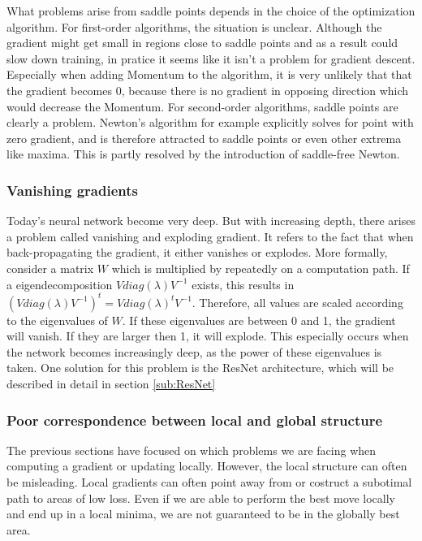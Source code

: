 What problems arise from saddle points depends in the choice of the optimization
algorithm. For first-order algorithms, the situation is unclear. Although the
gradient might get small in regions close to saddle points and as a result could
slow down training, in pratice it seems like it isn't a problem for gradient
descent. Especially when adding Momentum to the algorithm, it is very unlikely
that that the gradient becomes 0, because there is no gradient in opposing
direction which would decrease the Momentum. For second-order algorithms, saddle
points are clearly a problem. Newton's algorithm for example explicitly solves
for point with zero gradient, and is therefore attracted to saddle points or
even other extrema like maxima. This is partly resolved by the introduction of
saddle-free Newton. 


\subsubsection{Vanishing gradients}\label{sub:Vanishing_gradient} Today's neural
network become very deep. But with increasing depth, there arises a problem
called vanishing and exploding gradient. It refers to the fact that when
back-propagating the gradient, it either vanishes or explodes. More formally,
consider a matrix $W$ which is multiplied by repeatedly on a computation path.
If a eigendecomposition $Vdiag(\lambda )V^{-1}$ exists, this results in
$(Vdiag(\lambda )V^{-1})^t=Vdiag(\lambda )^tV^{-1}$. Therefore, all values are
scaled according to the eigenvalues of $W$. If these eigenvalues are between 0
and 1, the gradient will vanish. If they are larger then 1, it will explode.
This especially occurs when the network becomes increasingly deep, as the power
of these eigenvalues is taken. One solution for this problem is the ResNet
architecture, which will be described in detail in section \ref{sub:ResNet}

\subsubsection{Poor correspondence between local and global
structure}\label{prob:5}

The previous sections have focused on which problems we are facing when
computing a gradient or updating locally. However, the local structure can often
be misleading. Local gradients can often point away from  or costruct a
subotimal path to areas of low loss. Even if we are able to perform the best
move locally and end up in a local minima, we are not guaranteed to be in the
globally best area. 

